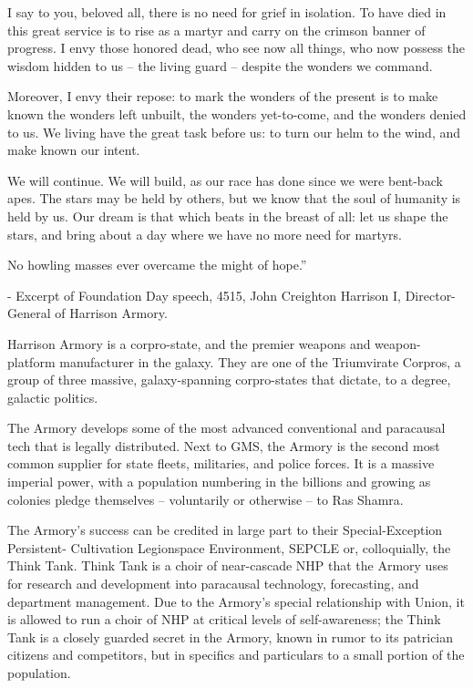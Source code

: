          I say to you, beloved all, there is no need for grief in isolation. To have died in this great  
         service is to rise as a martyr and carry on the crimson banner of progress. I envy those  
         honored dead, who see now all things, who now possess the wisdom hidden to us -- the  
         living guard -- despite the wonders we command.   

         Moreover, I envy their repose: to mark the wonders of the present is to make known the  
         wonders left unbuilt, the wonders yet-to-come, and the wonders denied to us. We living  
         have the great task before us: to turn our helm to the wind, and make known our intent.   

         We will continue. We will build, as our race has done since we were bent-back apes. The  
         stars may be held by others, but we know that the soul of humanity is held by us. Our  
         dream is that which beats in the breast of all: let us shape the stars, and bring about a day  
         where we have no more need for martyrs.   

         No howling masses ever overcame the might of hope.”  

                      -   Excerpt of Foundation Day speech, 4515, John Creighton Harrison I,  
                          Director-General of Harrison Armory.   

Harrison Armory is a corpro-state, and the premier weapons and weapon-platform manufacturer  
in the galaxy. They are one of the Triumvirate Corpros, a group of three massive, galaxy-spanning  
corpro-states that dictate, to a degree, galactic politics.   

                                                                                                                 


The Armory develops some of the most advanced conventional and paracausal tech that is legally  
distributed. Next to GMS, the Armory is the second most common supplier for state fleets,  
militaries, and police forces. It is a massive imperial power, with a population numbering in the  
billions and growing as colonies pledge themselves -- voluntarily or otherwise -- to Ras Shamra.   

The Armory’s success can be credited in large part to their Special-Exception Persistent- 
Cultivation Legionspace Environment, SEPCLE or, colloquially, the Think Tank. Think Tank is a  
choir of near-cascade NHP that the Armory uses for research and development into paracausal  
technology, forecasting, and department management. Due to the Armory’s special relationship  
with Union, it is allowed to run a choir of NHP at critical levels of self-awareness; the Think Tank is  
a closely guarded secret in the Armory, known in rumor to its patrician citizens and competitors,  
but in specifics and particulars to a small portion of the population.   

